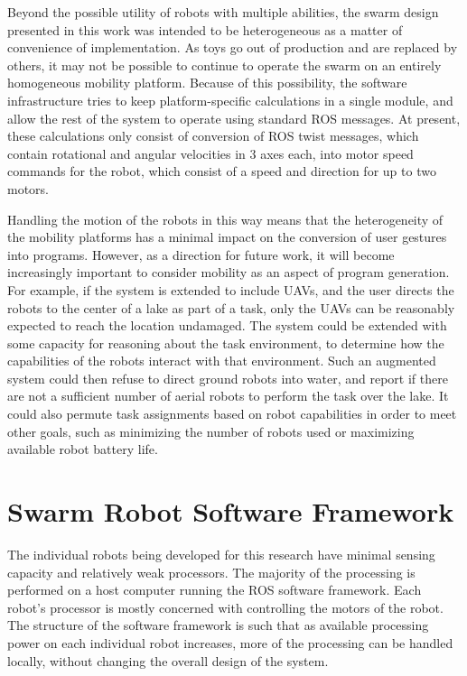 Beyond the possible utility of robots with multiple abilities, the swarm design presented in this work was intended to be heterogeneous as a matter of convenience of implementation. 
As toys go out of production and are replaced by others, it may not be possible to continue to operate the swarm on an entirely homogeneous mobility platform. 
Because of this possibility, the software infrastructure tries to keep platform-specific calculations in a single module, and allow the rest of the system to operate using standard ROS messages. 
At present, these calculations only consist of conversion of ROS twist messages, which contain rotational and angular velocities in 3 axes each, into motor speed commands for the robot, which consist of a speed and direction for up to two motors. 

Handling the motion of the robots in this way means that the heterogeneity of the mobility platforms has a minimal impact on the conversion of user gestures into programs. 
However, as a direction for future work, it will become increasingly important to consider mobility as an aspect of program generation. 
For example, if the system is extended to include UAVs, and the user directs the robots to the center of a lake as part of a task, only the UAVs can be reasonably expected to reach the location undamaged. 
The system could be extended with some capacity for reasoning about the task environment, to determine how the capabilities of the robots interact with that environment. 
Such an augmented system could then refuse to direct ground robots into water, and report if there are not a sufficient number of aerial robots to perform the task over the lake. 
It could also permute task assignments based on robot capabilities in order to meet other goals, such as minimizing the number of robots used or maximizing available robot battery life. 

\section{Swarm Robot Software Framework} \label{section:Swarm_Robot_Software_Framework}

The individual robots being developed for this research have minimal sensing capacity and relatively weak processors. 
The majority of the processing is performed on a host computer running the ROS software framework. 
Each robot's processor is mostly concerned with controlling the motors of the robot. 
The structure of the software framework is such that as available processing power on each individual robot increases, more of the processing can be handled locally, without changing the overall design of the system.

